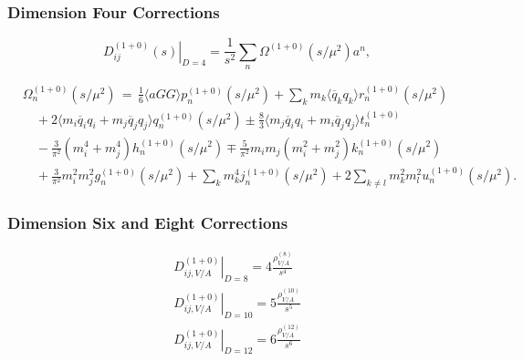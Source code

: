 \documentclass[fleqn]{beamer}
\begin{document}
\begin{frame}
  \frametitle{Dimension Four Corrections}
  \begin{equation}
    \left. D_{ij}^{(1+0)}(s) \right\rvert_{D=4} = \frac{1}{s^2} \sum_n \Omega^{(1+0)}(s/\mu^2)a^n,
  \end{equation}
  \vfill
  \begin{small}
    \begin{equation}
      \begin{split}
        &\Omega_n^{(1+0)} (s/\mu^2) \,=\, \frac{1}{6}\langle aGG \rangle p_n^{(1+0)}(s/\mu^2) + \sum_k m_k \langle \overline{q}_k q_k \rangle r_n^{(1+0)}(s/\mu^2) \\
        &\quad+ 2\langle m_i \overline{q}_i q_i + m_j \overline{q}_j q_j \rangle q_n^{(1+0)} (s/\mu^2) \pm \frac{8}{3} \langle m_j \overline{q}_i q_i + m_i \overline{q}_j q_j \rangle t_n^{(1+0)} \\
        &\quad- \frac{3}{\pi^2} (m_i^4 + m_j^4) h_n^{(1+0)} (s/\mu^2) \mp \frac{5}{\pi^2} m_i m_j (m_i^2 + m_j^2) k_n^{(1+0)}(s/\mu^2)\\
        &\quad+ \frac{3}{\pi^2} m_i^2 m_j^2 g_n^{(1+0)}(s/\mu^2) + \sum_k m_k^4
        j_n^{(1+0)}(s/\mu^2) + 2 \sum_{k \neq l} m_k^2 m_l^2 u_n^{(1+0)}(s/\mu^2).
      \end{split}
    \end{equation}
  \end{small}
\end{frame}
\begin{frame}
  \frametitle{Dimension Six  and Eight Corrections}
  \begin{ceqn}
    \begin{equation}
      \begin{split}
        \left. D_{ij,V/A}^{(1+0)} \right\rvert_{D=8} = 4 \frac{\rho_{V/A}^{(8)}}{s^4} \\
        \left. D_{ij,V/A}^{(1+0)} \right\rvert_{D=10} = 5 \frac{\rho_{V/A}^{(10)}}{s^5} \\
        \left. D_{ij,V/A}^{(1+0)} \right\rvert_{D=12} = 6 \frac{\rho_{V/A}^{(12)}}{s^6}
      \end{split} 
    \end{equation}
  \end{ceqn}
\end{frame}
\end{document}
